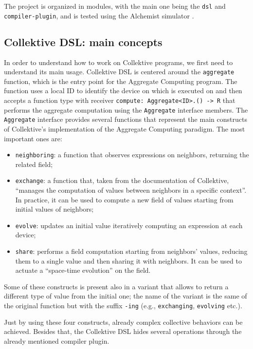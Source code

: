 \documentclass[12pt,a4paper,openright,twoside]{book}
\begin{document}
The project is organized in modules, with the main one being the \lstinline{dsl}
and \lstinline{compiler-plugin}, and is tested using the Alchemist simulator
\cite{DBLP:journals/jos/PianiniMV13}. 

\subsection{Collektive DSL: main concepts}

In order to understand how to work on Collektive programs, we first need to
understand its main usage. Collektive DSL is centered around the
\lstinline{aggregate} function, which is the entry point for the Aggregate
Computing program. The function uses a local ID to identify the device on which
is executed on and then accepts a function type with receiver
\lstinline{compute: Aggregate<ID>.() -> R} that performs the aggregate
computation using the \lstinline{Aggregate} interface members.
%
The \lstinline{Aggregate} interface provides several functions that represent
the main constructs of Collektive's implementation of the Aggregate Computing
paradigm. The most important ones are:
\begin{itemize}
  \item \lstinline{neighboring}: a function that observes expressions on
  neighbors, returning the related field;
  \item \lstinline{exchange}: a function that, taken from the documentation of
  Collektive, ``manages the computation of values between neighbors in a
  specific context''. In practice, it can be used to compute a new field of 
  values starting from initial values of neighbors;
  \item \lstinline{evolve}: updates an initial value iteratively computing an
  expression at each device;
  \item \lstinline{share}: performs a field computation starting from neighbors'
  values, reducing them to a single value and then sharing it with neighbors. 
  It can be used to actuate a ``space-time evolution'' on the field.
\end{itemize}

Some of these constructs is present also in a variant that allows to return a
different type of value from the initial one; the name of the variant is 
the same of the original function but with the suffix \lstinline{-ing} (e.g., 
\lstinline{exchanging}, \lstinline{evolving} etc.).

Just by using these four constructs, already complex collective behaviors can
be achieved. Besides that, the Collektive DSL hides several operations through
the already mentioned compiler plugin. 
\end{document}
